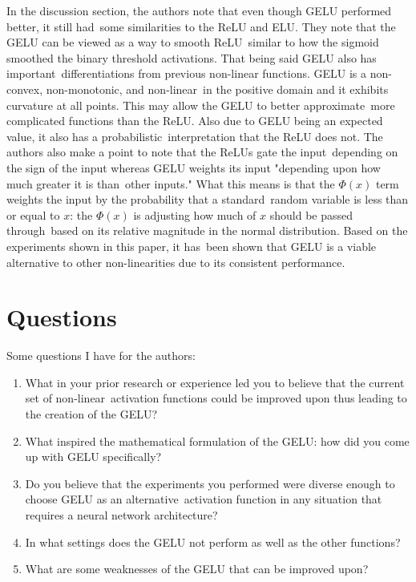 \documentclass[12pt]{article}
\begin{document}
In the discussion section, the authors note that even though GELU performed better, it still had\
some similarities to the ReLU and ELU. They note that the GELU can be viewed as a way to smooth ReLU\
similar to how the sigmoid smoothed the binary threshold activations. That being said GELU also has important\
differentiations from previous non-linear functions. GELU is a non-convex, non-monotonic, and non-linear\
in the positive domain and it exhibits curvature at all points. This may allow the GELU to better approximate\
more complicated functions than the ReLU. Also due to GELU being an expected value, it also has a probabilistic\
interpretation that the ReLU does not. The authors also make a point to note that the ReLUs gate the input\
depending on the sign of the input whereas GELU weights its input "depending upon how much greater it is than\
other inputs." What this means is that the $\Phi(x)$ term weights the input by the probability that a standard\
random variable is less than or equal to $x$: the $\Phi(x)$ is adjusting how much of $x$ should be passed through\
based on its relative magnitude in the normal distribution. Based on the experiments shown in this paper, it has\
been shown that GELU is a viable alternative to other non-linearities due to its consistent performance.

\section{Questions}

Some questions I have for the authors:

\begin{enumerate}
    \item What in your prior research or experience led you to believe that the current set of non-linear\
        activation functions could be improved upon thus leading to the creation of the GELU?
    \item What inspired the mathematical formulation of the GELU: how did you come up with GELU specifically?
    \item Do you believe that the experiments you performed were diverse enough to choose GELU as an alternative\
        activation function in any situation that requires a neural network architecture?
    \item In what settings does the GELU not perform as well as the other functions?
    \item What are some weaknesses of the GELU that can be improved upon?
\end{enumerate}




\end{document}

